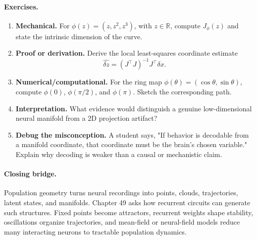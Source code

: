 \paragraph{Exercises.}
\begin{enumerate}[label=\textbf{48.4.\arabic*.}, leftmargin=*]
\item \textbf{Mechanical.} For \(\phi(z)=(z,z^2,z^3)\), with \(z\in\mathbb R\), compute \(J_\phi(z)\) and state the intrinsic dimension of the curve.
\item \textbf{Proof or derivation.} Derive the local least-squares coordinate estimate
\[
\widehat{\delta z}=(J^\top J)^{-1}J^\top\delta x.
\]
\item \textbf{Numerical/computational.} For the ring map \(\phi(\theta)=(\cos\theta,\sin\theta)\), compute \(\phi(0)\), \(\phi(\pi/2)\), and \(\phi(\pi)\). Sketch the corresponding path.
\item \textbf{Interpretation.} What evidence would distinguish a genuine low-dimensional neural manifold from a 2D projection artifact?
\item \textbf{Debug the misconception.} A student says, "If behavior is decodable from a manifold coordinate, that coordinate must be the brain's chosen variable." Explain why decoding is weaker than a causal or mechanistic claim.
\end{enumerate}

\paragraph{Closing bridge.}
Population geometry turns neural recordings into points, clouds, trajectories, latent states, and manifolds. Chapter 49 asks how recurrent circuits can generate such structures. Fixed points become attractors, recurrent weights shape stability, oscillations organize trajectories, and mean-field or neural-field models reduce many interacting neurons to tractable population dynamics.

\clearpage

